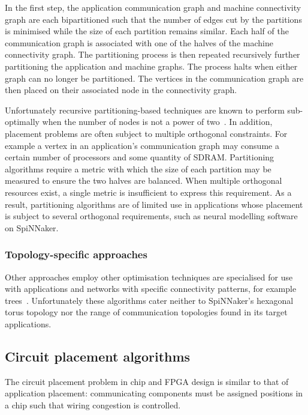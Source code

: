 				In the first step, the application communication graph and machine
				connectivity graph are each bipartitioned such that the number of edges
				cut by the partitions is minimised while the size of each partition
				remains similar. Each half of the communication graph is associated
				with one of the halves of the machine connectivity graph.  The
				partitioning process is then repeated recursively further partitioning
				the application and machine graphs. The process halts when either graph
				can no longer be partitioned.  The vertices in the communication graph
				are then placed on their associated node in the connectivity graph.
				
				Unfortunately recursive partitioning-based techniques are known to
				perform sub-optimally when the number of nodes is not a power of
				two~\cite{simon97}. In addition, placement problems are often subject
				to multiple orthogonal constraints. For example a vertex in an
				application's communication graph may consume a certain number of
				processors and some quantity of SDRAM. Partitioning algorithms require
				a metric with which the size of each partition may be measured to
				ensure the two halves are balanced. When multiple orthogonal resources
				exist, a single metric is insufficient to express this requirement. As
				a result, partitioning algorithms are of limited use in applications
				whose placement is subject to several orthogonal requirements, such as
				neural modelling software on SpiNNaker.
				
			\subsubsection{Topology-specific approaches}
				
				Other approaches employ other optimisation techniques are specialised
				for use with applications and networks with specific connectivity
				patterns, for example trees~\cite{jeannot14,traff02}. Unfortunately
				these algorithms cater neither to SpiNNaker's hexagonal torus topology
				nor the range of communication topologies found in its target
				applications.
	
		\subsection{Circuit placement algorithms}
			
			The circuit placement problem in chip and FPGA design is similar to that
			of application placement: communicating components must be assigned
			positions in a chip such that wiring congestion is controlled.
			
